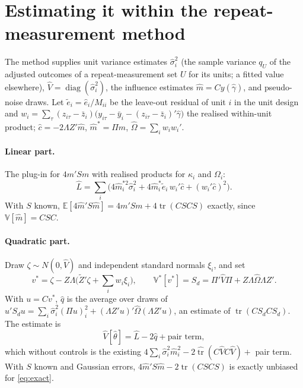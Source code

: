 \documentclass[11pt]{article}
\newcommand{\E}{\mathbb{E}}
\newcommand{\Var}{\mathbb{V}}
\newcommand{\tr}{\operatorname{tr}}
\begin{document}
\section{Estimating it within the repeat-measurement method}
The method supplies unit variance estimates $\hat\sigma_i^2$ (the sample variance $q_U$ of the adjusted outcomes
of a repeat-measurement set $U$ for its units; a fitted value elsewhere), $\hat V=\operatorname{diag}(\hat\sigma_i^2)$,
the influence estimates $\hat m=Cy(\hat\gamma)$, and pseudo-noise draws. Let $\tilde e_i=\hat e_i/M_{ii}$ be the
leave-out residual of unit $i$ in the unit design and
$w_i=\sum_\tau(z_{i\tau}-\bar z_i)\bigl(y_{i\tau}-\bar y_i-(z_{i\tau}-\bar z_i)'\hat\gamma\bigr)$ the realised
within-unit product; $\hat c=-2\Lambda Z'\hat m$, $\hat m^\ast=\Pi\hat m$, $\hat\Omega=\sum_iw_iw_i'$.

\paragraph{Linear part.} The plug-in for $4m'Sm$ with realised products for $\kappa_i$ and $\Omega_i$:
\begin{equation}\label{eq:Lhat}
 \hat L=\sum_i\bigl(4\hat m_i^{\ast2}\hat\sigma_i^2+4\hat m_i^\ast\tilde e_i\,w_i'\hat c+(w_i'\hat c)^2\bigr).
\end{equation}
With $S$ known, $\E[4\hat m'S\hat m]=4m'Sm+4\tr(CSCS)$ exactly, since $\Var[\hat m]=CSC$.

\paragraph{Quadratic part.} Draw $\zeta\sim N(0,\hat V)$ and independent standard normals $\xi_i$, and set
\begin{equation}\label{eq:draw}
 v^\ast=\zeta-Z\Lambda\bigl(\tilde Z'\zeta+\textstyle\sum_iw_i\xi_i\bigr),\qquad
 \Var^\ast[v^\ast]=S_d=\Pi'\hat V\Pi+Z\Lambda\hat\Omega\Lambda Z' .
\end{equation}
With $u=Cv^\ast$, $\hat q$ is the average over draws of $u'S_du=\sum_i\hat\sigma_i^2(\Pi u)_i^2+
(\Lambda Z'u)'\hat\Omega(\Lambda Z'u)$, an estimate of $\tr(CS_dCS_d)$. The estimate is
\begin{equation}\label{eq:Vhat}
 \hat V[\hat\theta]=\hat L-2\hat q+\text{pair term},
\end{equation}
which without controls is the existing $4\sum_i\hat\sigma_i^2\hat m_i^2-2\widehat{\tr}(C\hat VC\hat V)+$ pair term.
With $S$ known and Gaussian errors, $4\hat m'S\hat m-2\tr(CSCS)$ is exactly unbiased for \eqref{eq:exact}.
\end{document}
